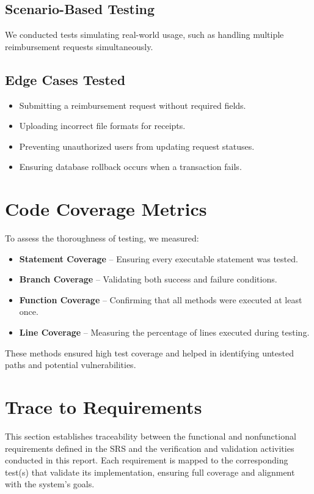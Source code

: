 \documentclass[12pt, titlepage]{article}
\begin{document}
\subsection*{Scenario-Based Testing}
We conducted tests simulating real-world usage, such as handling multiple reimbursement requests simultaneously.

\subsection*{Edge Cases Tested}
\begin{itemize}
    \item Submitting a reimbursement request without required fields.
    \item Uploading incorrect file formats for receipts.
    \item Preventing unauthorized users from updating request statuses.
    \item Ensuring database rollback occurs when a transaction fails.
\end{itemize}

\section*{Code Coverage Metrics}
To assess the thoroughness of testing, we measured:

\begin{itemize}
    \item \textbf{Statement Coverage} -- Ensuring every executable statement was tested.
    \item \textbf{Branch Coverage} -- Validating both success and failure conditions.
    \item \textbf{Function Coverage} -- Confirming that all methods were executed at least once.
    \item \textbf{Line Coverage} -- Measuring the percentage of lines executed during testing.
\end{itemize}

These methods ensured high test coverage and helped in identifying untested paths and potential vulnerabilities.

		
\section{Trace to Requirements}
This section establishes traceability between the functional and nonfunctional requirements defined in the SRS and the verification and validation activities conducted in this report. Each requirement is mapped to the corresponding test(s) that validate its implementation, ensuring full coverage and alignment with the system’s goals.
\end{document}
